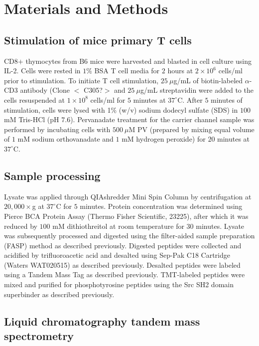 \documentclass[journal=jprobs,manuscript=article]{achemso}
\begin{document}
\section{Materials and Methods}



\subsection{Stimulation of mice primary T cells}

CD8$+$ thymocytes from B6 mice were harvested and blasted in cell culture using IL-2. Cells were rested in $1\%$ BSA T cell media for $2$ hours at $2\times 10^6$ cells/ml prior to stimulation. To initiate T cell stimulation, $25 \ \mu$g/mL of biotin-labeled $\alpha$-CD3 antibody (Clone $<$ C305?$>$ and $25 \ \mu$g/mL streptavidin were added to the cells resuspended at $1\times 10^8$ cells/ml for $5$ minutes at $37^{\circ}$C. After $5$ minutes of stimulation, cells were lysed with 1\% (w/v) sodium dodecyl sulfate (SDS) in $100$ mM Tris-HCl (pH $7.6$). Pervanadate treatment for the carrier channel sample was performed by incubating cells with $500 \ \mu$M PV (prepared by mixing equal volume of $1$ mM sodium orthovanadate and $1$ mM hydrogen peroxide) for $20$ minutes at $37^{\circ}$C.

\subsection{Sample processing}

Lysate was applied through QIAshredder Mini Spin Column by centrifugation at $20{,}000\times$g at $37^{\circ}$C for $5$ minutes. Protein concentration was determined using Pierce BCA Protein Assay (Thermo Fisher Scientific, 23225), after which it was reduced by $100$ mM dithiothreitol at room temperature for $30$ minutes. Lysate was subsequently processed and digested using the filter-aided sample preparation (FASP) method\cite{wisniewski2009universal} as described previously. Digested peptides were collected and acidified by trifluoroacetic acid and desalted using Sep-Pak C18 Cartridge (Waters WAT020515) as described previously\cite{ahsan2017quantitative}. Desalted peptides were labeled using a Tandem Mass Tag as described previously\cite{chua2020tandem}. TMT-labeled peptides were mixed and purified for phosphotyrosine peptides using the Src SH2 domain superbinder as described previously\cite{chua2020tandem}.

\subsection{Liquid chromatography tandem mass spectrometry}
\end{document}
